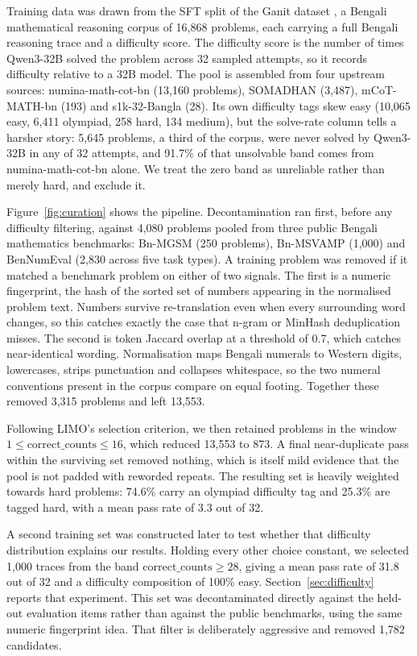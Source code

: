 Training data was drawn from the SFT split of the Ganit dataset
\parencite{ganitllm}, a Bengali mathematical reasoning corpus of 16,868
problems, each carrying a full Bengali reasoning trace and a difficulty score.
The difficulty score is the number of times Qwen3-32B solved the problem across
32 sampled attempts, so it records difficulty relative to a 32B model. The pool
is assembled from four upstream sources: numina-math-cot-bn (13,160 problems),
SOMADHAN (3,487), mCoT-MATH-bn (193) and s1k-32-Bangla (28). Its own difficulty
tags skew easy (10,065 easy, 6,411 olympiad, 258 hard, 134 medium), but the
solve-rate column tells a harsher story: 5,645 problems, a third of the corpus,
were never solved by Qwen3-32B in any of 32 attempts, and 91.7\% of that
unsolvable band comes from numina-math-cot-bn alone. We treat the zero band as
unreliable rather than merely hard, and exclude it.

Figure~\ref{fig:curation} shows the pipeline. Decontamination ran first, before
any difficulty filtering, against 4,080 problems pooled from three public
Bengali mathematics benchmarks: Bn-MGSM (250 problems), Bn-MSVAMP (1,000) and
BenNumEval (2,830 across five task types). A training problem was removed if it
matched a benchmark problem on either of two signals. The first is a numeric
fingerprint, the hash of the sorted set of numbers appearing in the normalised
problem text. Numbers survive re-translation even when every surrounding word
changes, so this catches exactly the case that n-gram or MinHash deduplication
misses. The second is token Jaccard overlap at a threshold of 0.7, which
catches near-identical wording. Normalisation maps Bengali numerals to Western
digits, lowercases, strips punctuation and collapses whitespace, so the two
numeral conventions present in the corpus compare on equal footing. Together
these removed 3,315 problems and left 13,553.

Following LIMO's selection criterion, we then retained problems in the window
$1 \leq \text{correct\_counts} \leq 16$, which reduced 13,553 to 873. A final
near-duplicate pass within the surviving set removed nothing, which is itself
mild evidence that the pool is not padded with reworded repeats. The resulting
set is heavily weighted towards hard problems: 74.6\% carry an olympiad
difficulty tag and 25.3\% are tagged hard, with a mean pass rate of 3.3 out of
32.

A second training set was constructed later to test whether that difficulty
distribution explains our results. Holding every other choice constant, we
selected 1,000 traces from the band $\text{correct\_counts} \geq 28$, giving a
mean pass rate of 31.8 out of 32 and a difficulty composition of 100\% easy.
Section~\ref{sec:difficulty} reports that experiment. This set was
decontaminated directly against the held-out evaluation items rather than
against the public benchmarks, using the same numeric fingerprint idea. That
filter is deliberately aggressive and removed 1,782 candidates.


